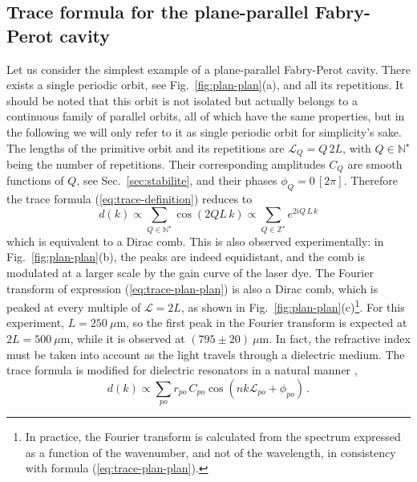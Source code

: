 \documentclass[10pt]{iopart}
\begin{document}
\subsection{Trace formula for the plane-parallel Fabry-Perot cavity} \label{sec:trace-FP}

Let us consider the simplest example of a plane-parallel Fabry-Perot cavity. There exists a single periodic orbit, see Fig.~\ref{fig:plan-plan}(a), and all its repetitions. It should be noted that this orbit is not isolated but actually belongs to a continuous family of parallel orbits, all of which have the same properties, but in the following we will only refer to it as single periodic orbit for simplicity's sake. The lengths of the primitive orbit and its repetitions are $\mathcal{L}_Q = Q \, 2 L$, with $Q \in \mathbb{N}^{\star}$ being the number of repetitions. Their corresponding amplitudes $C_Q$ are  smooth functions of $Q$, see Sec.~\ref{sec:stabilite}, and their phases $\phi_Q = 0\,[2\pi]$. Therefore the trace formula (\ref{eq:trace-definition}) reduces to
\begin{equation} \label{eq:trace-plan-plan}
d(k) \propto \sum_{Q\in\mathbb{N}^{\star}} \cos(2QL\,k) \propto \sum_{Q\in\mathbb{Z}^{\star}} e^{2 i Q \, L \, k}
\end{equation}
which is equivalent to a Dirac comb. This is also observed experimentally: in Fig.~\ref{fig:plan-plan}(b), the peaks are indeed equidistant, and the comb is modulated at a larger scale by the gain curve of the laser dye. The Fourier transform of expression (\ref{eq:trace-plan-plan}) is also a Dirac comb, which is peaked at every multiple of $\mathcal{L}=2L$, as shown in Fig.~\ref{fig:plan-plan}(c)\footnote{In practice, the Fourier transform is calculated from the spectrum expressed as a function of the wavenumber, and not of the wavelength, in consistency with formula (\ref{eq:trace-plan-plan}).}. For this experiment, $L = 250~\mu$m, so the first peak in the Fourier transform is expected at $2 L = 500~\mu$m, while it is observed at $(795 \pm 20)~\mu$m. In fact, the refractive index must be taken into account as the light travels through a dielectric medium. The trace formula is modified for dielectric resonators in a natural manner \cite{PRE-trace},
\begin{equation} \label{eq:trace-dielectrique}
d(k) \propto \sum_{po}r_{po} \, C_{po} \cos(n k \mathcal{L}_{po} + \phi_{po}) \, .
\end{equation}
\end{document}
